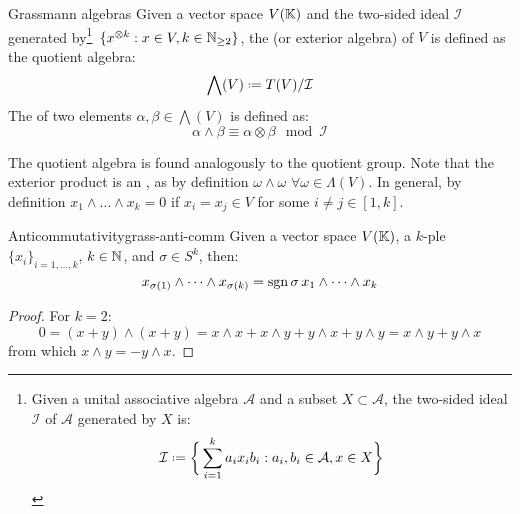 \begin{definition}{Grassmann algebras}{}
  Given a vector space $ V(\mathbb{K}) $ and the two-sided ideal $ \mathcal{I} $ generated by\footnote{Given a unital associative algebra $ \mathcal{A} $ and a subset $ X \subset \mathcal{A} $, the two-sided ideal $ \mathcal{I} $ of $ \mathcal{A} $ generated by $ X $ is:
  \begin{equation}
    \mathcal{I} \defeq \bigg\{ \sum_{i = 1}^k a_i x_i b_i : a_i,b_i \in \mathcal{A} , x \in X \bigg\}
\end{equation}}
$ \,\{x^{\otimes k} : x \in V, k \in \mathbb{N}_{\ge 2}\} $, the  (or exterior algebra) of $ V $ is defined as the quotient algebra:
\begin{equation}
  \bigwedge(V) \defeq T(V) / \mathcal{I}
\end{equation}
The  of two elements $ \alpha, \beta \in \bigwedge(V) $ is defined as:
\begin{equation}
  \alpha \wedge \beta \equiv \alpha \otimes \beta \mod\mathcal{I}
\end{equation}
\end{definition}

The quotient algebra is found analogously to the quotient group. Note that the exterior product is an , as by definition $ \omega \wedge \omega \,\,\forall \omega \in \Lambda(V) $. In general, by definition $ x_1 \wedge \dots \wedge x_k = 0 $ if $ x_i = x_j \in V $ for some $ i \neq j \in [1,k] $.

\begin{proposition}{Anticommutativity}{grass-anti-comm}
  Given a vector space $ V(\mathbb{K}) $, a $ k $-ple $ \{x_i\}_{i = 1, \dots, k} $, $ k \in \mathbb{N} $, and $ \sigma \in S^k $, then:
  \begin{equation}
    x_{\sigma(1)} \wedge \dots \wedge x_{\sigma(k)} = \mathrm{sgn}\,\sigma\, x_1 \wedge \dots \wedge x_k
  \end{equation}
\end{proposition}

\begin{proofbox}
  \begin{proof}
    For $ k = 2 $:
    \begin{equation*}
      0 = (x + y) \wedge (x + y) = x \wedge x + x \wedge y + y \wedge x + y \wedge y = x \wedge y + y \wedge x
    \end{equation*}
    from which $ x \wedge y = - y \wedge x $.
  \end{proof}
\end{proofbox}

